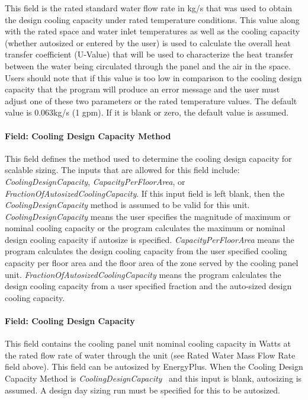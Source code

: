 This field is the rated standard water flow rate in kg/s that was used to obtain the design cooling capacity under rated temperature conditions.  This value along with the rated space and water inlet temperatures as well as the cooling capacity (whether autosized or entered by the user) is used to calculate the overall heat transfer coefficient (U-Value) that will be used to characterize the heat transfer between the water being circulated through the panel and the air in the space.  Users should note that if this value is too low in comparison to the cooling design capacity that the program will produce an error message and the user must adjust one of these two parameters or the rated temperature values.  The default value is 0.063kg/s (1 gpm).  If it is blank or zero, the default value is assumed.

\paragraph{Field: Cooling Design Capacity Method}\label{field-cooling-design-capacity-method-2}

This field defines the method used to determine the cooling design capacity for scalable sizing. The inputs that are allowed for this field include: \emph{CoolingDesignCapacity}, \emph{CapacityPerFloorArea}, or \emph{FractionOfAutosizedCoolingCapacity}. If this input field is left blank, then the \emph{CoolingDesignCapacity} method is assumed to be valid for this unit. \emph{CoolingDesignCapacity} means the user specifies the magnitude of maximum or nominal cooling capacity or the program calculates the maximum or nominal design cooling capacity if autosize is specified. \emph{CapacityPerFloorArea} means the program calculates the design cooling capacity from the user specified cooling capacity per floor area and the floor area of the zone served by the cooling panel unit. \emph{FractionOfAutosizedCoolingCapacity} means the program calculates the design cooling capacity from a user specified fraction and the auto-sized design cooling capacity.

\paragraph{Field: Cooling Design Capacity}\label{field-cooling-design-capacity-2}

This field contains the cooling panel unit nominal cooling capacity in Watts at the rated flow rate of water through the unit (see Rated Water Mass Flow Rate field above). This field can be autosized by EnergyPlus. When the Cooling Design Capacity Method is \emph{CoolingDesignCapacity}~ and this input is blank, autosizing is assumed. A design day sizing run must be specified for this to be autosized.

